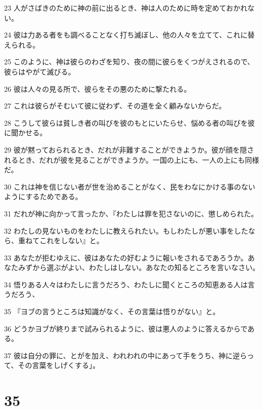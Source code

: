 \par 23 人がさばきのために神の前に出るとき、神は人のために時を定めておかれない。
\par 24 彼は力ある者をも調べることなく打ち滅ぼし、他の人々を立てて、これに替えられる。
\par 25 このように、神は彼らのわざを知り、夜の間に彼らをくつがえされるので、彼らはやがて滅びる。
\par 26 彼は人々の見る所で、彼らをその悪のために撃たれる。
\par 27 これは彼らがそむいて彼に従わず、その道を全く顧みないからだ。
\par 28 こうして彼らは貧しき者の叫びを彼のもとにいたらせ、悩める者の叫びを彼に聞かせる。
\par 29 彼が黙っておられるとき、だれが非難することができようか。彼が顔を隠されるとき、だれが彼を見ることができようか。一国の上にも、一人の上にも同様だ。
\par 30 これは神を信じない者が世を治めることがなく、民をわなにかける事のないようにするためである。
\par 31 だれが神に向かって言ったか、『わたしは罪を犯さないのに、懲しめられた。
\par 32 わたしの見ないものをわたしに教えられたい。もしわたしが悪い事をしたなら、重ねてこれをしない』と。
\par 33 あなたが拒むゆえに、彼はあなたの好むように報いをされるであろうか。あなたみずから選ぶがよい、わたしはしない。あなたの知るところを言いなさい。
\par 34 悟りある人々はわたしに言うだろう、わたしに聞くところの知恵ある人は言うだろう、
\par 35 『ヨブの言うところは知識がなく、その言葉は悟りがない』と。
\par 36 どうかヨブが終りまで試みられるように、彼は悪人のように答えるからである。
\par 37 彼は自分の罪に、とがを加え、われわれの中にあって手をうち、神に逆らって、その言葉をしげくする」。

\chapter{35}

